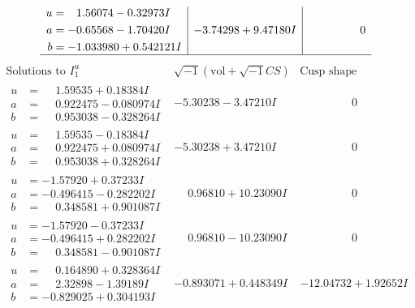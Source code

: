 \documentclass[1p]{elsarticle_modified}
\theoremstyle{definition}
\newcommand{\I}{\sqrt{-1}}
\begin{document}
$$\begin{array}{c|c|c}
\begin{aligned}
u &= \phantom{-}1.56074 - 0.32973 I \\
a &= -0.65568 - 1.70420 I \\
b &= -1.033980 + 0.542121 I\end{aligned}
 & -3.74298 + 9.47180 I & \phantom{-0.000000 } 0\\
 \hline 
 \end{array}$$\newpage$$\begin{array}{c|c|c}  
\text{Solutions to }I^u_{1}& \I (\text{vol} + \sqrt{-1}CS) & \text{Cusp shape}\\
 \hline 
\begin{aligned}
u &= \phantom{-}1.59535 + 0.18384 I \\
a &= \phantom{-}0.922475 - 0.080974 I \\
b &= \phantom{-}0.953038 - 0.328264 I\end{aligned}
 & -5.30238 - 3.47210 I & \phantom{-0.000000 } 0 \\ \hline\begin{aligned}
u &= \phantom{-}1.59535 - 0.18384 I \\
a &= \phantom{-}0.922475 + 0.080974 I \\
b &= \phantom{-}0.953038 + 0.328264 I\end{aligned}
 & -5.30238 + 3.47210 I & \phantom{-0.000000 } 0 \\ \hline\begin{aligned}
u &= -1.57920 + 0.37233 I \\
a &= -0.496415 - 0.282202 I \\
b &= \phantom{-}0.348581 + 0.901087 I\end{aligned}
 & \phantom{-}0.96810 + 10.23090 I & \phantom{-0.000000 } 0 \\ \hline\begin{aligned}
u &= -1.57920 - 0.37233 I \\
a &= -0.496415 + 0.282202 I \\
b &= \phantom{-}0.348581 - 0.901087 I\end{aligned}
 & \phantom{-}0.96810 - 10.23090 I & \phantom{-0.000000 } 0 \\ \hline\begin{aligned}
u &= \phantom{-}0.164890 + 0.328364 I \\
a &= \phantom{-}2.32898 - 1.39189 I \\
b &= -0.829025 + 0.304193 I\end{aligned}
 & -0.893071 + 0.448349 I & -12.04732 + 1.92652 I \\ \hline\begin{aligned}

\end{aligned}
\end{array}$$
\end{document}
